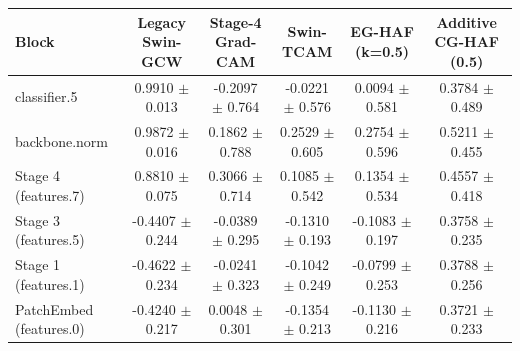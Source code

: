 \begin{tabular}{lccccc}
\toprule
Block & Legacy Swin-GCW & Stage-4 Grad-CAM & Swin-TCAM & EG-HAF (k=0.5) & Additive CG-HAF (0.5) \\
\midrule
classifier.5 & 0.9910 $\pm$ 0.013 & -0.2097 $\pm$ 0.764 & -0.0221 $\pm$ 0.576 & 0.0094 $\pm$ 0.581 & 0.3784 $\pm$ 0.489 \\
backbone.norm & 0.9872 $\pm$ 0.016 & 0.1862 $\pm$ 0.788 & 0.2529 $\pm$ 0.605 & 0.2754 $\pm$ 0.596 & 0.5211 $\pm$ 0.455 \\
Stage 4 (features.7) & 0.8810 $\pm$ 0.075 & 0.3066 $\pm$ 0.714 & 0.1085 $\pm$ 0.542 & 0.1354 $\pm$ 0.534 & 0.4557 $\pm$ 0.418 \\
Stage 3 (features.5) & -0.4407 $\pm$ 0.244 & -0.0389 $\pm$ 0.295 & -0.1310 $\pm$ 0.193 & -0.1083 $\pm$ 0.197 & 0.3758 $\pm$ 0.235 \\
Stage 1 (features.1) & -0.4622 $\pm$ 0.234 & -0.0241 $\pm$ 0.323 & -0.1042 $\pm$ 0.249 & -0.0799 $\pm$ 0.253 & 0.3788 $\pm$ 0.256 \\
PatchEmbed (features.0) & -0.4240 $\pm$ 0.217 & 0.0048 $\pm$ 0.301 & -0.1354 $\pm$ 0.213 & -0.1130 $\pm$ 0.216 & 0.3721 $\pm$ 0.233 \\
\bottomrule
\end{tabular}
